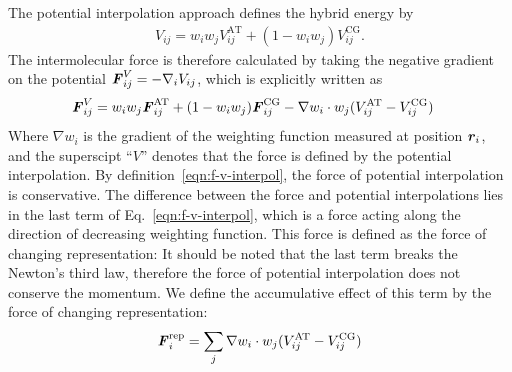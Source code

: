 \documentclass[epjST]{svjour}
\newcommand{\vect}[1]{\textbf{\textit{#1}}}
\newcommand{\AT}[0]{\textrm{AT}}
\newcommand{\CG}[0]{\textrm{CG}}
\newcommand{\moleidxone}[0]{i}
\newcommand{\moleidxtwo}[0]{j}
\newcommand{\rep}{{\textrm{rep}}}
\begin{document}
The potential interpolation approach defines the hybrid energy by
\begin{align}\label{eqn:v-v-interpol}
  {V}_{\moleidxone \moleidxtwo}=w_\moleidxone w_\moleidxtwo{V}_{\moleidxone\moleidxtwo}^{\AT}+(1-w_\moleidxone w_\moleidxtwo){V}^{\CG}_{\moleidxone\moleidxtwo}.
\end{align}
The intermolecular force is therefore calculated by taking the negative gradient on the potential ${\vect F}^V_{\moleidxone \moleidxtwo}= -\nabla_{\moleidxone}{V}_{\moleidxone \moleidxtwo}$,
which is explicitly written as
\begin{align}\label{eqn:f-v-interpol}
  {\vect F}^V_{\moleidxone \moleidxtwo}
  &=w_\moleidxone w_\moleidxtwo{\vect F}_{\moleidxone\moleidxtwo}^{\AT}+(1-w_\moleidxone w_\moleidxtwo){\vect F}^{\CG}_{\moleidxone\moleidxtwo}  - \nabla w_\moleidxone\cdot w_\moleidxtwo (V^\AT_{\moleidxone \moleidxtwo} - V^\CG_{\moleidxone \moleidxtwo})
\end{align}
Where $\nabla w_\moleidxone$ is the gradient of the weighting function measured at position $\vect r_\moleidxone$,
and the superscipt ``$V$'' denotes that the force is defined
by the potential interpolation.
By  definition~\eqref{eqn:f-v-interpol}, the force of potential interpolation is conservative. 
The difference between the force and potential
interpolations lies in the last term  of Eq.~\eqref{eqn:f-v-interpol}, which is a force
acting along the direction of decreasing weighting function.
This force is defined as the force of changing representation:
It should be noted that
the last term breaks the Newton's third law, therefore the force of potential interpolation
does not conserve the momentum.
We define the accumulative effect of this term by the force of changing representation:
\begin{align}
  \vect F_\moleidxone^\rep = \sum_{\moleidxtwo}  \nabla w_\moleidxone\cdot w_\moleidxtwo (V^\AT_{\moleidxone \moleidxtwo} - V^\CG_{\moleidxone \moleidxtwo})
\end{align}
\end{document}
